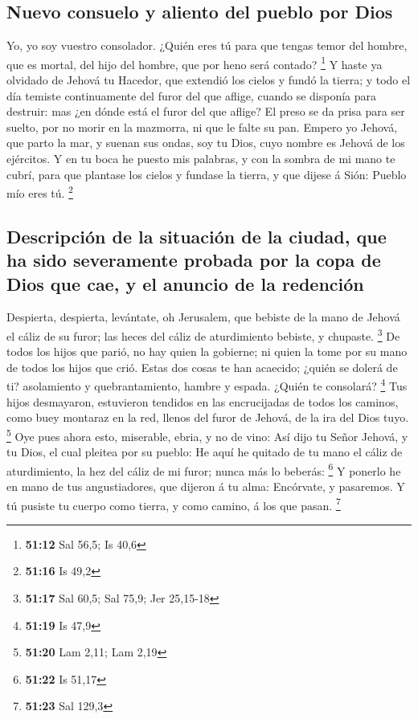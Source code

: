 \hypertarget{nuevo-consuelo-y-aliento-del-pueblo-por-dios}{%
\subsection{Nuevo consuelo y aliento del pueblo por
Dios}\label{nuevo-consuelo-y-aliento-del-pueblo-por-dios}}

 Yo, yo soy vuestro consolador. ¿Quién eres tú para que
tengas temor del hombre, que es mortal, del hijo del hombre, que por
heno será contado? \footnote{\textbf{51:12} Sal 56,5; Is 40,6}
 Y haste ya olvidado de Jehová tu Hacedor, que extendió
los cielos y fundó la tierra; y todo el día temiste continuamente del
furor del que aflige, cuando se disponía para destruir: mas ¿en dónde
está el furor del que aflige?  El preso se da prisa para
ser suelto, por no morir en la mazmorra, ni que le falte su pan.
 Empero yo Jehová, que parto la mar, y suenan sus ondas,
soy tu Dios, cuyo nombre es Jehová de los ejércitos.  Y
en tu boca he puesto mis palabras, y con la sombra de mi mano te cubrí,
para que plantase los cielos y fundase la tierra, y que dijese á Sión:
Pueblo mío eres tú. \footnote{\textbf{51:16} Is 49,2}

\hypertarget{descripciuxf3n-de-la-situaciuxf3n-de-la-ciudad-que-ha-sido-severamente-probada-por-la-copa-de-dios-que-cae-y-el-anuncio-de-la-redenciuxf3n}{%
\subsection{Descripción de la situación de la ciudad, que ha sido
severamente probada por la copa de Dios que cae, y el anuncio de la
redención}\label{descripciuxf3n-de-la-situaciuxf3n-de-la-ciudad-que-ha-sido-severamente-probada-por-la-copa-de-dios-que-cae-y-el-anuncio-de-la-redenciuxf3n}}

 Despierta, despierta, levántate, oh Jerusalem, que
bebiste de la mano de Jehová el cáliz de su furor; las heces del cáliz
de aturdimiento bebiste, y chupaste. \footnote{\textbf{51:17} Sal 60,5;
  Sal 75,9; Jer 25,15-18}  De todos los hijos que parió,
no hay quien la gobierne; ni quien la tome por su mano de todos los
hijos que crió.  Estas dos cosas te han acaecido; ¿quién
se dolerá de ti? asolamiento y quebrantamiento, hambre y espada. ¿Quién
te consolará? \footnote{\textbf{51:19} Is 47,9}  Tus
hijos desmayaron, estuvieron tendidos en las encrucijadas de todos los
caminos, como buey montaraz en la red, llenos del furor de Jehová, de la
ira del Dios tuyo. \footnote{\textbf{51:20} Lam 2,11; Lam 2,19}
 Oye pues ahora esto, miserable, ebria, y no de vino:
 Así dijo tu Señor Jehová, y tu Dios, el cual pleitea por
su pueblo: He aquí he quitado de tu mano el cáliz de aturdimiento, la
hez del cáliz de mi furor; nunca más lo beberás: \footnote{\textbf{51:22}
  Is 51,17}  Y ponerlo he en mano de tus angustiadores,
que dijeron á tu alma: Encórvate, y pasaremos. Y tú pusiste tu cuerpo
como tierra, y como camino, á los que pasan. \footnote{\textbf{51:23}
  Sal 129,3}

